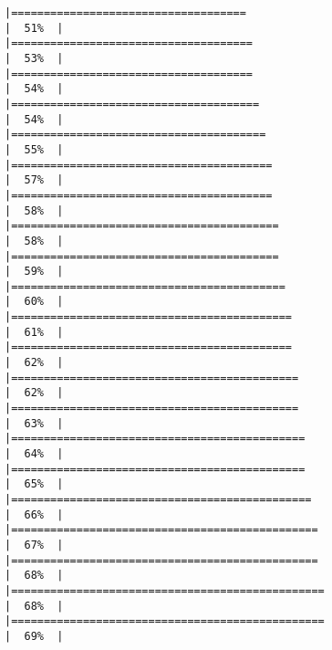 \documentclass[
]{article}
\begin{document}
\begin{verbatim}
|====================================                                  |  51%  |                                                                              |=====================================                                 |  53%  |                                                                              |=====================================                                 |  54%  |                                                                              |======================================                                |  54%  |                                                                              |=======================================                               |  55%  |                                                                              |========================================                              |  57%  |                                                                              |========================================                              |  58%  |                                                                              |=========================================                             |  58%  |                                                                              |=========================================                             |  59%  |                                                                              |==========================================                            |  60%  |                                                                              |===========================================                           |  61%  |                                                                              |===========================================                           |  62%  |                                                                              |============================================                          |  62%  |                                                                              |============================================                          |  63%  |                                                                              |=============================================                         |  64%  |                                                                              |=============================================                         |  65%  |                                                                              |==============================================                        |  66%  |                                                                              |===============================================                       |  67%  |                                                                              |===============================================                       |  68%  |                                                                              |================================================                      |  68%  |                                                                              |================================================                      |  69%  |                                                                              
\end{verbatim}
\end{document}
